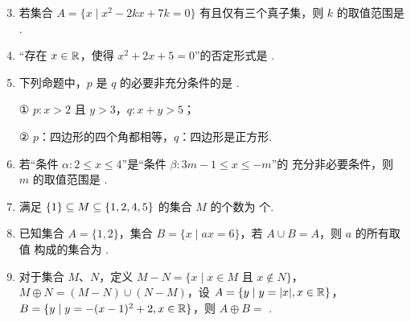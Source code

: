 \documentclass[a4paper,11pt]{article}
\begin{document}


\begin{enumerate}
\setcounter{enumi}{2}

\item 若集合 $A=\{x\mid x^2-2kx+7k=0\}$ 有且仅有三个真子集，则 $k$ 的取值范围是
\blankline[4.4em].


\item “存在 $x\in\mathbb{R}$，使得 $x^2+2x+5=0$”的否定形式是 \blankline[4.4em].


\item 下列命题中，$p$ 是 $q$ 的必要非充分条件的是 \blankline[4.4em].

① $p:x>2$ 且 $y>3$，$q:x+y>5$；

② $p$：四边形的四个角都相等，$q$：四边形是正方形.


\item 若“条件 $\alpha:2\leqslant x\leqslant4$”是“条件 $\beta:3m-1\leqslant x\leqslant-m$”的
充分非必要条件，则 $m$ 的取值范围是 \blankline[4.4em].

\ans{$(-\infty,-4]$}

\item 满足 $\{1\}\subseteq M\subseteq\{1,2,4,5\}$ 的集合 $M$ 的个数为 \blankline[4.4em] 个.


\item 已知集合 $A=\{1,2\}$，集合 $B=\{x\mid ax=6\}$，若 $A\cup B=A$，则 $a$ 的所有取值
构成的集合为 \blankline[4.4em].

\ifanswer
\solbegin
{}
\solend

\fi

\item 对于集合 $M$、$N$，定义 $M-N=\{x\mid x\in M\text{ 且 }x\notin N\}$，
$M\oplus N=(M-N)\cup(N-M)$，设 $A=\{y\mid y=|x|,x\in\mathbb{R}\}$，
$B=\{y\mid y=-(x-1)^2+2,x\in\mathbb{R}\}$，则 $A\oplus B=$ \blankline[4.4em].

\ifanswer
\solbegin
{}
\solend


\end{enumerate}
\end{document}
